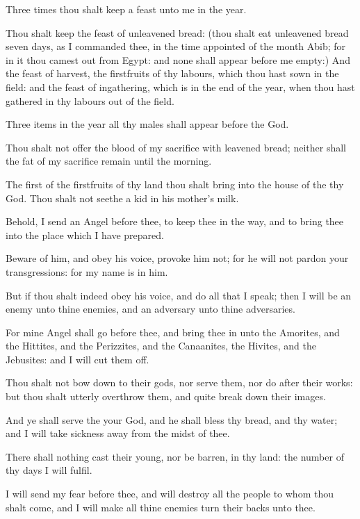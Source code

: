 \verse Three times thou shalt keep a feast unto me in the year.

\verse Thou shalt keep the feast of unleavened bread: (thou shalt eat unleavened bread seven days, as I commanded thee, in the time appointed of the month Abib; for in it thou camest out from Egypt: and none shall appear before me empty:) \verse And the feast of harvest, the firstfruits of thy labours, which thou hast sown in the field: and the feast of ingathering, which is in the end of the year, when thou hast gathered in thy labours out of the field.

\verse Three items in the year all thy males shall appear before the \LORD God.

\verse Thou shalt not offer the blood of my sacrifice with leavened bread; neither shall the fat of my sacrifice remain until the morning.

\verse The first of the firstfruits of thy land thou shalt bring into the house of the \LORD thy God. Thou shalt not seethe a kid in his mother's milk.

\verse Behold, I send an Angel before thee, to keep thee in the way, and to bring thee into the place which I have prepared.

\verse Beware of him, and obey his voice, provoke him not; for he will not pardon your transgressions: for my name is in him.

\verse But if thou shalt indeed obey his voice, and do all that I speak; then I will be an enemy unto thine enemies, and an adversary unto thine adversaries.

\verse For mine Angel shall go before thee, and bring thee in unto the Amorites, and the Hittites, and the Perizzites, and the Canaanites, the Hivites, and the Jebusites: and I will cut them off.

\verse Thou shalt not bow down to their gods, nor serve them, nor do after their works: but thou shalt utterly overthrow them, and quite break down their images.

\verse And ye shall serve the \LORD your God, and he shall bless thy bread, and thy water; and I will take sickness away from the midst of thee.

\verse There shall nothing cast their young, nor be barren, in thy land: the number of thy days I will fulfil.

\verse I will send my fear before thee, and will destroy all the people to whom thou shalt come, and I will make all thine enemies turn their backs unto thee.

